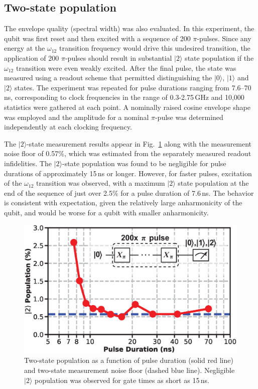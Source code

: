 \documentclass[journal]{IEEEtran}
\newcommand{\CR}[1]{{\color{black}#1}}
\begin{document}
\subsection{Two-state population}The envelope quality (spectral width) was also evaluated. In this experiment, the qubit was first reset and then excited with a sequence of 200 $\pi$-pulses. Since any energy at the $\omega_\text{12}$ transition frequency would drive this undesired transition,  the application of 200 $\pi$-pulses should result in substantial $|2\rangle$ state population if the $\omega_{12}$ transition were even weakly excited. After the final pulse, the state was measured using a readout scheme that permitted distinguishing the $|0\rangle$, $|1\rangle$ and $|2\rangle$ states. The experiment was repeated for pulse durations ranging from 7.6--70\,ns, corresponding to clock frequencies in the range of 0.3-2.75\,GHz and 10,000 statistics were gathered at each point. A nominally raised cosine envelope shape was employed and the amplitude for a nominal $\pi$-pulse was determined independently at each clocking frequency. 

The $|2\rangle$-state measurement results appear in Fig.~\ref{twostateres} along with the measurement noise floor of 0.57\%, which was estimated from the separately measured readout infidelities. The $|2\rangle$-state population was found to be negligible for pulse durations of approximately 15\,ns or longer. However, for faster pulses, excitation of the $\omega_\text{12}$ transition was observed, with a maximum $|2\rangle$ state population \CR{at the end of the sequence} of just over 2.5\%  for a pulse duration of 7.6\,ns. The behavior is consistent with expectation, given the relatively large anharmonicity of the qubit, and would be worse for a qubit with smaller anharmonicity. 
\begin{figure}[bt!]
\includegraphics[width=\columnwidth]{Figures/FIGURE_20}
\caption{Two-state population as a function of pulse duration (solid red line) and two-state measurement noise floor (dashed blue line). Negligible $|2\rangle$ population was observed for gate times as short as 15\,ns.}\label{twostateres}
\end{figure}
\end{document}
